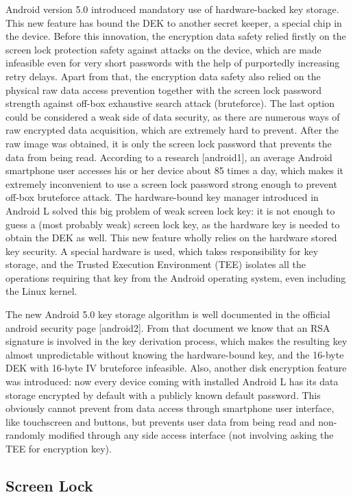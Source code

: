 Android version 5.0 introduced mandatory use of hardware-backed key storage. This new feature has bound the DEK to another secret keeper, a special chip in the device. Before this innovation, the encryption data safety relied firstly on the screen lock protection safety against attacks on the device, which are made infeasible even for very short passwords with the help of purportedly increasing retry delays. Apart from that, the encryption data safety also relied on the physical raw data access prevention together with the screen lock password strength against off-box exhaustive search attack (bruteforce). The last option could be considered a weak side of data security, as there are numerous ways of raw encrypted data acquisition, which are extremely hard to prevent. After the raw image was obtained, it is only the screen lock password that prevents the data from being read. According to a  research [android1], an average Android smartphone user accesses his or her device about 85 times a day, which makes it extremely inconvenient to use a screen lock password strong enough to prevent off-box bruteforce attack. The hardware-bound key manager introduced in Android L solved this big problem of weak screen lock key: it is not enough to guess a (most probably weak) screen lock key, as the hardware key is needed to obtain the DEK as well. This new feature wholly relies on the hardware stored key security. A special hardware is used, which takes responsibility for key storage, and the Trusted Execution Environment (TEE) isolates all the operations requiring that key from the Android operating system, even including the Linux kernel. 

The new Android 5.0 key storage algorithm is well documented in the official android security page [android2]. From that document we know that an RSA signature is involved in the key derivation process, which makes the resulting key almost unpredictable without knowing the hardware-bound key, and the 16-byte DEK with 16-byte IV bruteforce infeasible. Also, another disk encryption feature was introduced: now every device coming with installed Android L has its data storage encrypted by default with a publicly known default password. This obviously cannot prevent from data access through smartphone user interface, like touchscreen and buttons, but prevents user data from being read and non-randomly modified through any side access interface (not involving asking the TEE for encryption key).



\subsection{Screen Lock}


